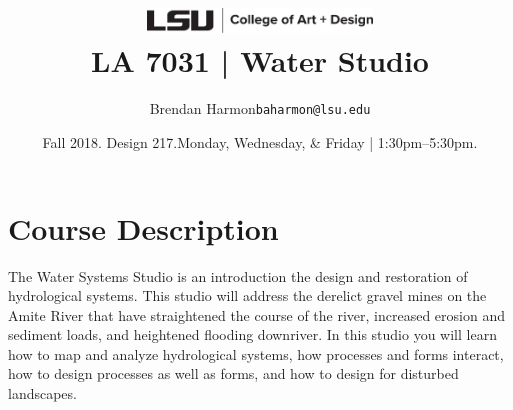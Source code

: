 \documentclass[11pt,article,oneside]{memoir}
\makeatletter
\def\myauthor{Author}
\def\mytitle{Title}
\def\myemail{baharmon@lsu.edu}
\def\myauthor{Brendan Harmon}
\def\mytitle{ \includegraphics[width=6cm]{../images/logos/lsu_art_design_logo.pdf} \\[0.1cm] {\normalfont \normalsize LA 7031 |} \Large Water Studio}
\newcommand{\globalcolor}[1]{%
  \color{#1}\global\let\default@color\current@color
}
\makeatother
\begin{document}
\setlength\bibitemsep{0.75em}

\setmainfont[Scale=1, Path = fonts/lato/,BoldItalicFont=Lato-RegIta,BoldFont=Lato-Reg,ItalicFont=Lato-LigIta]{Lato-Lig}
\setsansfont[Scale=1, Path = fonts/lato/,BoldItalicFont=Lato-RegIta,BoldFont=Lato-Reg,ItalicFont=Lato-LigIta]{Lato-Lig}
\setmonofont[Mapping=tex-text,Scale=0.8,Path = fonts/inconsolata/]{i}

\def\ind{\hangindent=1 true cm\hangafter=1 \noindent}
\def\labelitemi{$\cdot$}

\title{\LARGE \mytitle}
\author{\Large\myauthor \newline \footnotesize\texttt{\noindent\myemail}}
\date{Fall 2018. Design 217.\newline Monday, Wednesday, \& Friday | 1:30pm--5:30pm.}
\published{\,}




\globalcolor{black}

\vspace*{-10em}
\maketitle

\section{Course Description}
%
The Water Systems Studio
is an introduction the design and restoration of hydrological systems.
This studio will address the derelict gravel mines on the Amite River
that have straightened the course of the river,
increased erosion and sediment loads,
and heightened flooding downriver.
In this studio you will learn 
how to map and analyze hydrological systems,
how processes and forms interact,
how to design processes as well as forms, and
how to design for disturbed landscapes. \\
\end{document}
